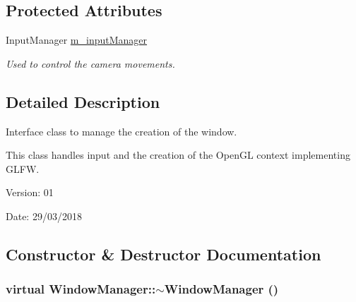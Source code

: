 \subsection*{Protected Attributes}
\begin{CompactItemize}
\item 
\hypertarget{class_window_manager_df17f87e4722c2a30b80a25081901dbd}{
InputManager \hyperlink{class_window_manager_df17f87e4722c2a30b80a25081901dbd}{m\_\-inputManager}}
\label{class_window_manager_df17f87e4722c2a30b80a25081901dbd}

\begin{CompactList}\small\item\em Used to control the camera movements. \item\end{CompactList}\end{CompactItemize}


\subsection{Detailed Description}
Interface class to manage the creation of the window. 

This class handles input and the creation of the OpenGL context implementing GLFW.

\begin{Desc}
\item[Version:]01 \end{Desc}
\begin{Desc}
\item[Date:]29/03/2018 \end{Desc}


\subsection{Constructor \& Destructor Documentation}
\hypertarget{class_window_manager_d2c42494d2d9045b18a3a09e5920290f}{
\subsubsection[$\sim$WindowManager]{\setlength{\rightskip}{0pt plus 5cm}virtual WindowManager::$\sim$WindowManager ()}}
\label{class_window_manager_d2c42494d2d9045b18a3a09e5920290f}


